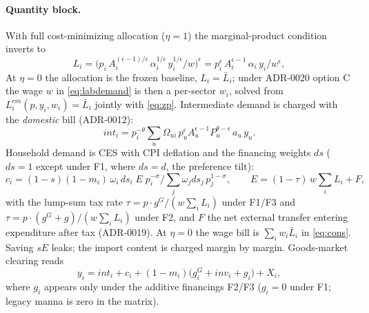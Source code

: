 \documentclass[11pt]{article}
\numberwithin{equation}{section}
\begin{document}
\paragraph{Quantity block.} With full cost-minimizing allocation
($\eta = 1$) the marginal-product condition inverts to
\begin{equation}
L_i = \big( p_i\, A_i^{(\epsilon-1)/\epsilon}\, \alpha_i^{1/\epsilon}\,
      y_i^{1/\epsilon} / w \big)^{\epsilon}
    = p_i^{\epsilon}\, A_i^{\epsilon-1}\, \alpha_i\, y_i / w^{\epsilon},
\label{eq:labdemand}
\end{equation}
At $\eta = 0$ the allocation is the frozen baseline, $L_i = \bar{L}_i$;
\textcolor{revisionV1}{under ADR-0020 option C the wage $w$ in
\eqref{eq:labdemand} is then a per-sector $w_i$, solved from
$L^{cm}_i(p, y_i, w_i) = \bar{L}_i$ jointly with \eqref{eq:zp}.}
Intermediate demand is charged with the \emph{domestic}
bill (ADR-0012):
\begin{equation}
int_i = p_i^{-\theta} \sum_u \Omega_{ui}\,
        p_u^{\epsilon} A_u^{\epsilon-1} P_u^{\theta-\epsilon}\, a_u\, y_u.
\label{eq:int}
\end{equation}
Household demand is CES with CPI deflation and the financing weights
$ds$ ($ds = 1$ except under F1, where $ds = d$, the preference tilt):
\begin{equation}
c_i = (1-s)(1-m_i)\,\omega_i\, ds_i\; E\; p_i^{-\sigma} \Big/
      \textstyle\sum_j \omega_j ds_j\, p_j^{1-\sigma},
\qquad
E = (1-\tau)\, w \textstyle\sum_i L_i + F,
\label{eq:cons}
\end{equation}
with the lump-sum tax rate $\tau = p\!\cdot\! g^G / (w \sum_i L_i)$ under
F1/F3 and $\tau = p\!\cdot\!(g^G + g)/(w \sum_i L_i)$ under F2, and $F$ the
net external transfer entering expenditure after tax (ADR-0019).
\textcolor{revisionV1}{At $\eta = 0$ the wage bill is
$\sum_i w_i \bar{L}_i$ in \eqref{eq:cons}.} Saving
$sE$ leaks; the import content is charged margin by margin. Goods-market
clearing reads
\begin{equation}
y_i = int_i + c_i + (1-m_i)\big( g^G_i + inv_i + g_i \big) + X_i,
\label{eq:clearing}
\end{equation}
where $g_i$ appears only under the additive financings F2/F3
($g_i = 0$ under F1; legacy manna is zero in the matrix).
\end{document}
